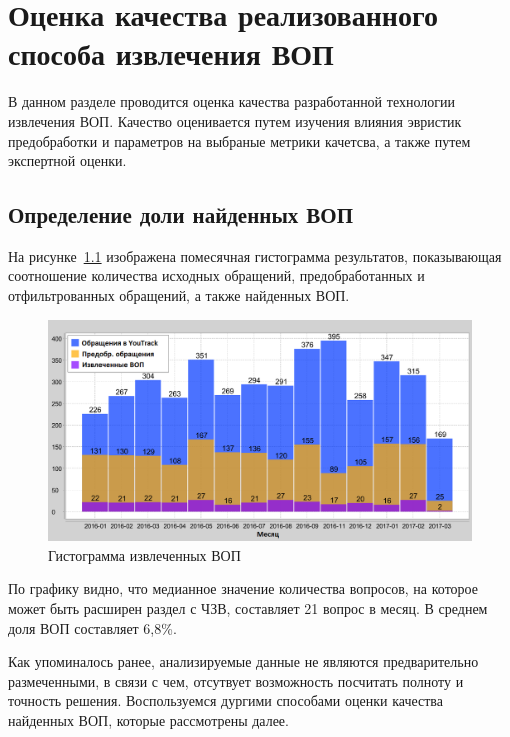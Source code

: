 \chapter{Оценка качества реализованного способа извлечения ВОП}
\label{chap:quality}

В данном разделе проводится оценка качества разработанной технологии извлечения ВОП. Качество оценивается путем изучения влияния эвристик предобработки и параметров на выбраные метрики качетсва, а также путем экспертной оценки.

\section{Определение доли найденных ВОП}

На рисунке~\ref{fig:tickets_distr} изображена помесячная гистограмма результатов, показывающая соотношение количества исходных обращений, предобработанных и отфильтрованных обращений, а также найденных ВОП. 

\begin{figure}[tph!]
\centerline{\includegraphics[width=11.5cm]{fig/tickets_distr.png}}
    \caption{Гистограмма извлеченных ВОП}
    \label{fig:tickets_distr}
\end{figure}

По графику видно, что медианное значение количества вопросов, на которое может быть расширен раздел с ЧЗВ, составляет 21 вопрос в месяц. В среднем доля ВОП составляет 6,8\%.

Как упоминалось ранее, анализируемые данные не являются предварительно размеченными, в связи с чем, отсутвует возможность посчитать полноту и точность решения. Воспользуемся дургими способами оценки качества найденных ВОП, которые рассмотрены далее.

